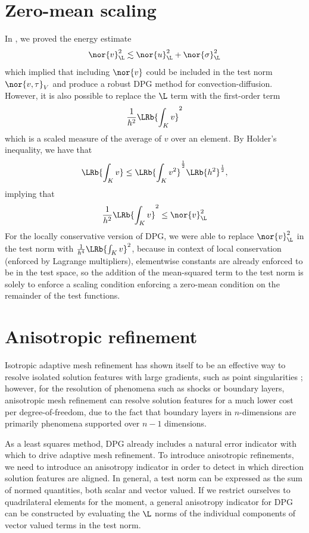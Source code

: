 \section{Zero-mean scaling}

In \cite{DPGrobustness, ChanHeuerBui-ThanhDemkowicz12}, we proved the energy estimate
\[
\nor{v}^2_{\L} \lesssim \nor{u}^2_{\L} + \nor{\sigma}^2_{\L}
\]
which implied that including $\nor{v}$ could be included in the test norm $\nor{v,\tau}_V$ and produce a robust DPG method for convection-diffusion.  However, it is also possible to replace the $\L$ term with the first-order term 
\[
\frac{1}{h^2}\LRb{\int_K v}^2
\]
which is a scaled measure of the average of $v$ over an element.  By Holder's inequality, we have that 
\[
\LRb{\int_K v} \leq \LRb{\int_K v^2}^{\frac{1}{2}} \LRb{h^2}^{\frac{1}{2}}, 
\]
implying that 
\[
\frac{1}{h^2}\LRb{\int_K v}^2 \leq \nor{v}^2_{\L}
\]
For the locally conservative version of DPG, we were able to replace $\nor{v}^2_{\L}$ in the test norm with $\frac{1}{h^4}\LRb{\int_K v}^2$, because in context of local conservation (enforced by Lagrange multipliers), elementwise constants are already enforced to be in the test space, so the addition of the mean-squared term to the test norm is solely to enforce a scaling condition enforcing a zero-mean condition on the remainder of the test functions.

\section{Anisotropic refinement}

Isotropic adaptive mesh refinement has shown itself to be an effective way to resolve isolated solution features with large gradients, such as point singularities \cite{FindBabuskaPaper}; however, for the resolution of phenomena such as shocks or boundary layers, anisotropic mesh refinement can resolve solution features for a much lower cost per degree-of-freedom, due to the fact that boundary layers in $n$-dimensions are primarily phenomena supported over $n-1$ dimensions.  

As a least squares method, DPG already includes a natural error indicator with which to drive adaptive mesh refinement.  To introduce anisotropic refinements, we need to introduce an anisotropy indicator in order to detect in which direction solution features are aligned.  In general, a test norm can be expressed as the sum of normed quantities, both scalar and vector valued.  If we restrict ourselves to quadrilateral elements for the moment, a general anisotropy indicator for DPG can be constructed by evaluating the $\L$ norms of the individual components of vector valued terms in the test norm.  

